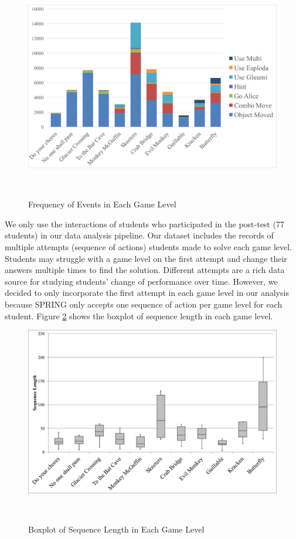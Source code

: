 \documentclass{sigchi}
\def\algname{SPRING\xspace}
\begin{document}
	
	\begin{figure}
		\centering
		\includegraphics[width=0.9\columnwidth]{figures/frequency.pdf}
		\caption{Frequency of Events in Each Game Level}~\label{fig:frequency}
	\end{figure}	
	

	We only use the interactions of students who participated in the post-test (77 students) in our data analysis pipeline.
	Our dataset includes the records of multiple attempts (sequence of actions) students made to solve each game level.
	Students may struggle with a game level on the first attempt and change their answers multiple times to find the solution.	
	Different attempts are a rich data source for studying students' change of performance over time.	
	However, we decided to  only incorporate the first attempt in each game level in our analysis because \algname only accepts one sequence of action per game level for each student.
	Figure \ref{fig:boxplot} shows the boxplot of sequence length in each game level. 
	\newline	
	\newline	

	\begin{figure}
		\centering
		\includegraphics[width=0.9\columnwidth]{figures/boxplot.pdf}
		\caption{Boxplot of Sequence Length in Each Game Level}~\label{fig:boxplot}
	\end{figure}
		
\end{document}
